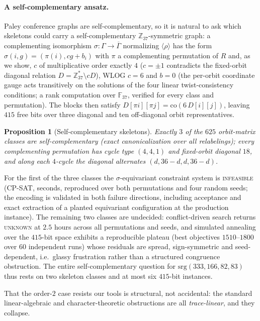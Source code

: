 \documentclass[11pt]{article}
\newtheorem{proposition}{Proposition}
\theoremstyle{definition}
\newcommand{\Z}{\mathbb{Z}}
\begin{document}
\paragraph{A self-complementary ansatz.} Paley conference graphs are self-complementary, so it is
natural to ask which skeletons could carry a self-complementary $\Z_{37}$-symmetric graph: a
complementing isomorphism $\sigma:\Gamma\to\overline\Gamma$ normalizing $\langle\rho\rangle$ has the
form $\sigma(i,g)=(\pi(i),cg+b_i)$ with $\pi$ a complementing permutation of $R$ and, as we show,
$c$ of multiplicative order exactly $4$ ($c=\pm1$ contradicts the fixed-orbit diagonal relation
$D=\Z_{37}^\ast\setminus cD$), WLOG $c=6$ and $b=0$ (the per-orbit coordinate gauge acts
transitively on the solutions of the four linear twist-consistency conditions; a rank computation
over $\mathbb F_{37}$, verified for every class and permutation). The blocks then satisfy
$D[\pi i][\pi j]=\mathrm{co}(6\,D[i][j])$, leaving $415$ free bits over three diagonal and ten
off-diagonal orbit representatives.

\begin{proposition}[Self-complementary skeletons]\label{prop:selfcomp}
Exactly $3$ of the $625$ orbit-matrix classes are self-complementary (exact canonicalization over
all relabelings); every complementing permutation has cycle type $(4,4,1)$ and fixed-orbit diagonal
$18$, and along each $4$-cycle the diagonal alternates $(d,36-d,d,36-d)$.
\end{proposition}

For the first of the three classes the $\sigma$-equivariant constraint system is \textsc{infeasible}
(CP-SAT, seconds, reproduced over both permutations and four random seeds; the encoding is validated
in both failure directions, including acceptance and exact extraction of a planted equivariant
configuration at the production instance). The remaining two classes are undecided: conflict-driven
search returns \textsc{unknown} at $2.5$ hours across all permutations and seeds, and simulated
annealing over the $415$-bit space exhibits a reproducible plateau (best objectives
$1510$--$1800$ over $60$ independent runs) whose residuals are spread, sign-symmetric and
seed-dependent, i.e.\ glassy frustration rather than a structured congruence obstruction. The
entire self-complementary question for $\mathrm{srg}(333,166,82,83)$ thus rests on two skeleton
classes and at most six $415$-bit instances.

That the order-$2$ case resists our tools is structural, not accidental: the standard linear-algebraic and
character-theoretic obstructions are all \emph{trace-linear}, and they collapse.
\end{document}
